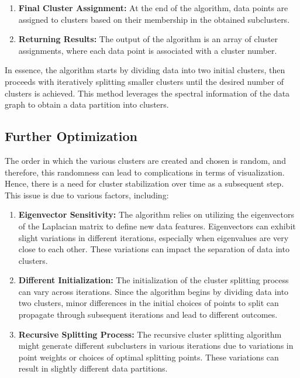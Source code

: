 \begin{enumerate}
  \item \textbf{Final Cluster Assignment:}
  At the end of the algorithm, data points are assigned to clusters based on their membership in the obtained subclusters.
  
  \item \textbf{Returning Results:}
  The output of the algorithm is an array of cluster assignments, where each data point is associated with a cluster number.
  
\end{enumerate}

In essence, the algorithm starts by dividing data into two initial clusters, then proceeds with iteratively splitting smaller clusters until the desired number of clusters is achieved.
This method leverages the spectral information of the data graph to obtain a data partition into clusters.


\subsection{Further Optimization}
The order in which the various clusters are created and chosen is random, and therefore, this randomness can lead to complications in terms of visualization. Hence, there is a need for cluster stabilization over time as a subsequent step. This issue is due to various factors, including:

\begin{enumerate}

    \item \textbf{Eigenvector Sensitivity:}
    The algorithm relies on utilizing the eigenvectors of the Laplacian matrix to define new data features. Eigenvectors can exhibit slight variations in different iterations, especially when eigenvalues are very close to each other. These variations can impact the separation of data into clusters.
    
    \item \textbf{Different Initialization:}
    The initialization of the cluster splitting process can vary across iterations. Since the algorithm begins by dividing data into two clusters, minor differences in the initial choices of points to split can propagate through subsequent iterations and lead to different outcomes.
    
    \item \textbf{Recursive Splitting Process:}
    The recursive cluster splitting algorithm might generate different subclusters in various iterations due to variations in point weights or choices of optimal splitting points. These variations can result in slightly different data partitions.

\end{enumerate}    